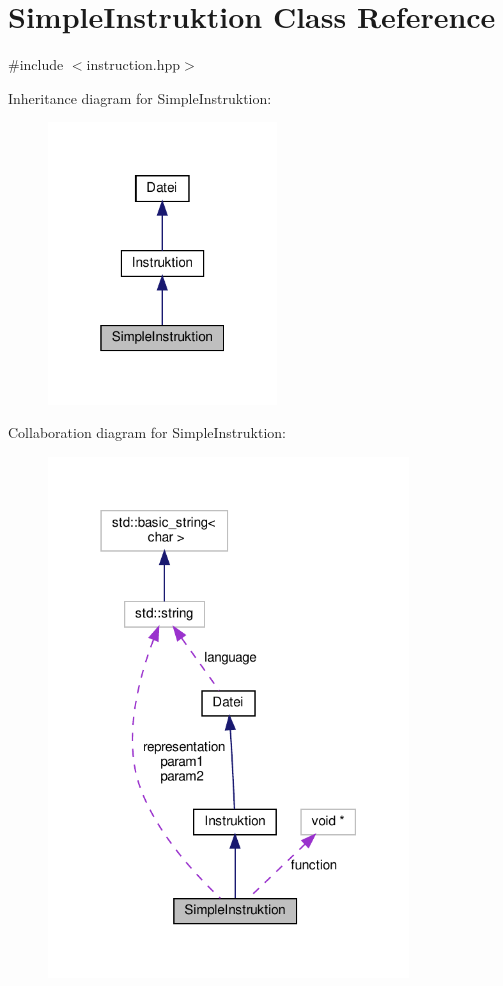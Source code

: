 \hypertarget{class_simple_instruktion}{}\section{Simple\+Instruktion Class Reference}
\label{class_simple_instruktion}


{\ttfamily \#include $<$instruction.\+hpp$>$}



Inheritance diagram for Simple\+Instruktion\+:
\nopagebreak
\begin{figure}[H]
\begin{center}
\leavevmode
\includegraphics[width=172pt]{class_simple_instruktion__inherit__graph}
\end{center}
\end{figure}


Collaboration diagram for Simple\+Instruktion\+:
\nopagebreak
\begin{figure}[H]
\begin{center}
\leavevmode
\includegraphics[width=271pt]{class_simple_instruktion__coll__graph}
\end{center}
\end{figure}
